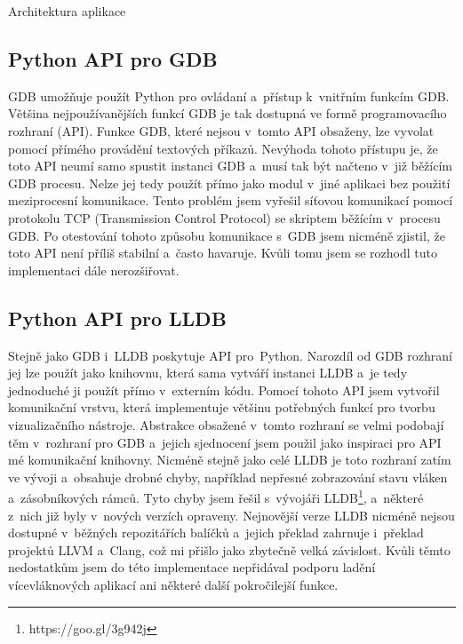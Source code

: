 \documentclass[czech,bachelor,male,python,dept460,hidelinks]{diploma}						%
\begin{document}
\begin{section}{Architektura aplikace}
		\subsection{Python API pro GDB}
		\label{ref:GdbPythonApi}
		GDB umožňuje použít Python pro ovládaní a~přístup k~vnitřním funkcím GDB. \cite{gdb-python-api}
		Většina nejpoužívanějších funkcí GDB je tak dostupná ve formě programovacího rozhraní (API). Funkce GDB, které nejsou v~tomto API obsaženy, lze vyvolat
		pomocí přímého provádění textových příkazů. Nevýhoda tohoto přístupu je, že toto API neumí samo spustit instanci GDB a~musí tak být načteno v~již běžícím
		GDB procesu. Nelze jej tedy použít přímo jako modul v~jiné aplikaci bez použití meziprocesní komunikace.
		Tento problém jsem vyřešil síťovou komunikací pomocí protokolu TCP (Transmission Control Protocol) se skriptem běžícím v~procesu GDB.
		Po otestování tohoto způsobu komunikace s~GDB jsem nicméně zjistil, že toto API není příliš stabilní a~často havaruje. Kvůli tomu jsem se rozhodl tuto
		implementaci dále nerozšiřovat.
		
		\subsection{Python API pro LLDB}
		Stejně jako GDB i~LLDB poskytuje API pro~Python.  Narozdíl od GDB rozhraní jej lze použít jako knihovnu, která sama vytváří instanci LLDB
		a~je tedy jednoduché ji použít přímo v~externím kódu.
		Pomocí tohoto API jsem vytvořil komunikační vrstvu, která implementuje většinu potřebných funkcí pro tvorbu vizualizačního nástroje.
		Abstrakce obsažené v~tomto rozhraní se velmi podobají těm v~rozhraní pro GDB a~jejich sjednocení jsem použil jako inspiraci pro API mé komunikační knihovny.
		Nicméně stejně jako celé LLDB je toto rozhraní zatím ve vývoji a~obsahuje drobné chyby, například nepřesné zobrazování stavu vláken a~zásobníkových rámců.
		Tyto chyby jsem řešil s~vývojáři LLDB\footnote{https://goo.gl/3g942j}, a~některé z~nich již byly v~nových verzích opraveny.
		Nejnovější verze LLDB nicméně nejsou dostupné v~běžných repozitářích balíčků a~jejich překlad zahrnuje i~překlad projektů LLVM a~Clang,
		což mi přišlo jako zbytečně velká závislost. Kvůli těmto nedostatkům jsem do této implementace nepřidával podporu ladění vícevláknových
		aplikací ani některé další pokročilejší funkce.
		

\end{section}
\end{document}

